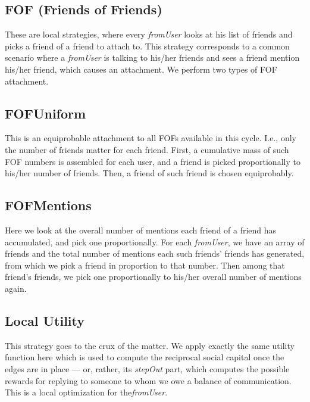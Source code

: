 \documentclass[10pt,oneside]{memoir}
\begin{document}
\subsection{FOF (Friends of Friends)}
\label{foffriendsoffriends}

These are local strategies, where every \emph{fromUser} looks at his list of friends and picks a friend of a friend to attach to.  This strategy corresponds to a common scenario where a \emph{fromUser} is talking to his/her friends and sees a friend mention his/her friend, which causes an attachment.  We perform two types of FOF attachment.


\subsection{FOFUniform}
\label{fofuniform}

This is an equiprobable attachment to all FOFs available in this cycle.  I.e., only the number of friends matter for each friend.  First, a cumulative mass of such FOF numbers is assembled for each user, and a friend is picked proportionally to his/her number of friends.  Then, a friend of such friend is chosen equiprobably.


\subsection{FOFMentions}
\label{fofmentions}

Here we look at the overall number of mentions each friend of a friend has accumulated, and pick one proportionally.  For each \emph{fromUser}, we have an array of friends and the total number of mentions each such friends' friends has generated, from which we pick a friend in proportion to that number.  Then among that friend's friends, we pick one proportionally to his/her overall number of mentions again.


\subsection{Local Utility}
\label{localutility}

This strategy goes to the crux of the matter.  We apply exactly the same utility function here which is used to compute the reciprocal social capital once the edges are in place --- or, rather, its \emph{stepOut} part, which computes the possible rewards for replying to someone to whom we owe a balance of communication.  This is a local optimization for the\emph{fromUser}. 
\end{document}
